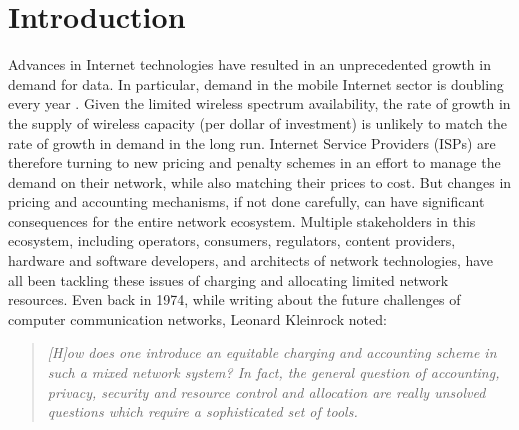\section{Introduction}\label{intro}

Advances in Internet technologies have resulted in an unprecedented growth in demand for data. In particular, demand in the mobile Internet sector is doubling every year \cite{CiscoVNI}. Given the limited wireless spectrum availability, the rate of growth in the supply of wireless capacity (per dollar of investment) is unlikely to match the rate of growth in demand in the long run. Internet Service Providers (ISPs) are therefore turning to new pricing and penalty schemes in an effort to manage the demand on their network, while also matching their prices to cost. But changes in pricing and accounting mechanisms, if not done carefully, can have significant consequences for the entire network ecosystem. Multiple stakeholders in this ecosystem, including operators, consumers, regulators, content providers, hardware and software developers, and architects of network technologies, have all been tackling these issues of charging and allocating limited network resources. Even back in 1974, while writing about the future challenges of computer communication networks, Leonard Kleinrock \cite{Kleinrock} noted: 
\begin{quote}
\emph{[H]ow does one introduce an equitable charging and accounting scheme in such a mixed network system? In fact, the general question of accounting, privacy, security and resource control and allocation are really unsolved questions which require a sophisticated set of tools.}
\end{quote}
